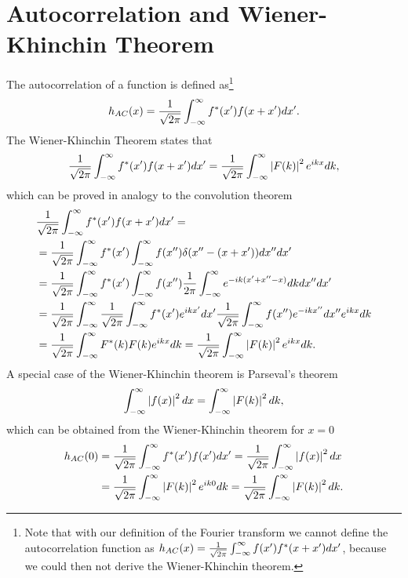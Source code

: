 \section{Autocorrelation and Wiener-Khinchin Theorem}
The autocorrelation of a function is defined as\footnote{Note that
with our definition of the Fourier transform we cannot define  
the autocorrelation function as $h_{AC}(x) = \ft \iinf f(x') f^*(x+x') dx'$,
because we could then not derive the Wiener-Khinchin theorem.}
\begin{align}
h_{AC}(x) = \ft \iinf f^*(x') f(x+x') dx'.
\end{align}
The Wiener-Khinchin Theorem states that 
\begin{align}
\ft \iinf f^*(x') f(x+x') dx' = \ft \iinf \abs{F(k)}^2 e^{ikx} dk,
\end{align}
which can be proved in analogy to the convolution theorem
\begin{align*}
&\ft \iinf f^*(x') f(x+x') dx' =\\
&=\ft \iinf f^*(x') \iinf f(x'') \delta(x''-(x+x')) dx'' dx'\\
&=\ft \iinf f^*(x') \iinf f(x'') \fft \iinf e^{-ik(x'+x''-x)} dk dx'' dx'\\
&=\ft \iinf \ft \iinf f^*(x') e^{ikx'} dx' \ft \iinf f(x'') e^{-ikx''} dx''
e^{ikx} dk\\
&=\ft \iinf F^*(k) F(k) e^{ikx} dk = \ft \iinf \abs{F(k)}^2 e^{ikx} dk.
\end{align*}
A special case of the Wiener-Khinchin theorem is Parseval's theorem
\begin{align}
\iinf \abs{f(x)}^2 dx = \iinf \abs{F(k)}^2 dk, 
\end{align}
which can be obtained from the Wiener-Khinchin theorem for $x=0$
\begin{align*}
h_{AC}(0)&= \ft \iinf f^*(x') f(x') dx' = \ft \iinf \abs{f(x)}^2 dx \\
&= \ft \iinf \abs{F(k)}^2 e^{ik0} dk = \ft \iinf \abs{F(k)}^2 dk.
\end{align*}

